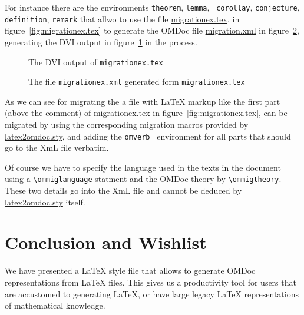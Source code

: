 \documentclass{article}
\def\xml{{\sc XmL}}
\def\omdocname{{\sc OMDoc}}
\begin{document}
For instance there are the environments {\tt theorem}, {\tt lemma}, {\tt
  corollay}, {\tt conjecture}, {\tt definition}, {\tt remark} that allwo to use
the file {\url{migrationex.tex}}, in figure~\ref{fig:migrationex.tex} to generate
the {\omdocname} file {\url{migration.xml}} in figure~\ref{fig:migrationex.xml},
generating the DVI output in figure~\ref{fig:migrationex.dvi} in the process.
\begin{figure}[htbp]
  \begin{center}
    \fbox{\begin{minipage}{12cm}\scriptsize\end{minipage}}
    \caption{The DVI output of {\tt migrationex.tex}}
    \label{fig:migrationex.dvi}
  \end{center}
\end{figure}
\begin{figure}[htbp]
  \begin{center}
    \fbox{\begin{minipage}{12cm}\scriptsize\end{minipage}}
    \caption{The file {\tt migrationex.xml} generated form {\tt migrationex.tex}}
    \label{fig:migrationex.xml}
  \end{center}
\end{figure}
As we can see for migrating the a file with {\LaTeX} markup like the first part
(above the comment) of {\url{migrationex.tex}} in
figure~\ref{fig:migrationex.tex}, can be migrated by using the corresponding
migration macros provided by {\url{latex2omdoc.sty}}, and adding the {\tt omverb }
environment for all parts that should go to the {\xml} file verbatim.

Of course we have to specify the language used in the texts in the document using
a {\verb+\ommiglanguage+} statment and the {\omdocname} theory by
{\verb+\ommigtheory+}. These two details go into the {\xml} file and cannot be
deduced by {\url{latex2omdoc.sty}} itself.


\section{Conclusion and Wishlist}\label{sec:concl}

We have presented a {\LaTeX} style file that allows to generate {\omdocname}
representations from {\LaTeX} files. This gives us a productivity tool for users
that are accustomed to generating {\LaTeX}, or have large legacy {\LaTeX}
representations of mathematical knowledge.
\end{document}
